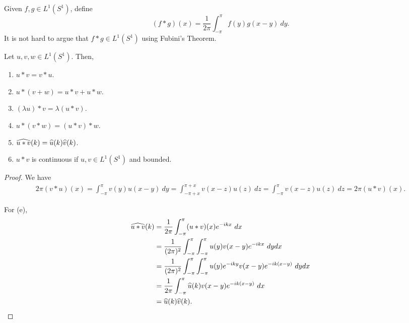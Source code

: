 \begin{definition}
    Given $f,g\in L^1(S^1)$, define 
    \begin{equation*}
        (f\ast g)(x) = \frac{1}{2\pi}\int_{-\pi}^{\pi}f(y)g(x - y)~dy.
    \end{equation*}
    It is not hard to argue that $f\ast g\in L^1(S^1)$ using Fubini's Theorem.
\end{definition}

\begin{proposition}
    Let $u,v,w\in L^1(S^1)$. Then, 
    \begin{enumerate}[label=(\alph*)]
        \item $u\ast v = v\ast u$.
        \item $u\ast(v + w) = u\ast v + u\ast w$.
        \item $(\lambda u)\ast v = \lambda(u\ast v)$.
        \item $u\ast (v\ast w) = (u\ast v)\ast w$.
        \item $\widehat{u\ast v}(k) = \widehat{u}(k)\widehat{v}(k)$.
        \item $u\ast v$ is continuous if $u,v\in L^1(S^1)$ and bounded.
    \end{enumerate}
\end{proposition}
\begin{proof}
    We have 
    \begin{align*}
        2\pi (v\ast u)(x) = \int_{-\pi}^\pi v(y)u(x - y)~dy = \int_{-\pi + x}^{\pi + x} v(x - z)u(z)~dz = \int_{-\pi}^\pi v(x - z)u(z)~dz = 2\pi(u\ast v)(x).
    \end{align*}

    For (e), 
    \begin{align*}
        \widehat{u\ast v}(k) &= \frac{1}{2\pi}\int_{-\pi}^\pi(u\ast v)(x)e^{-ikx}~dx\\
        &= \frac{1}{(2\pi)^2}\int_{-\pi}^\pi \int_{-\pi}^\pi u(y)v(x - y)e^{-ikx}~dy dx\\
        &= \frac{1}{(2\pi)^2}\int_{-\pi}^\pi\int_{-\pi}^\pi u(y)e^{-iky}v(x - y)e^{-ik(x - y)}~dydx\\
        &= \frac{1}{2\pi}\int_{-\pi}^\pi\widehat{u}(k)v(x -y)e^{-ik(x - y)}~dx\\
        &= \widehat{u}(k)\widehat{v}(k).
    \end{align*}
\end{proof}